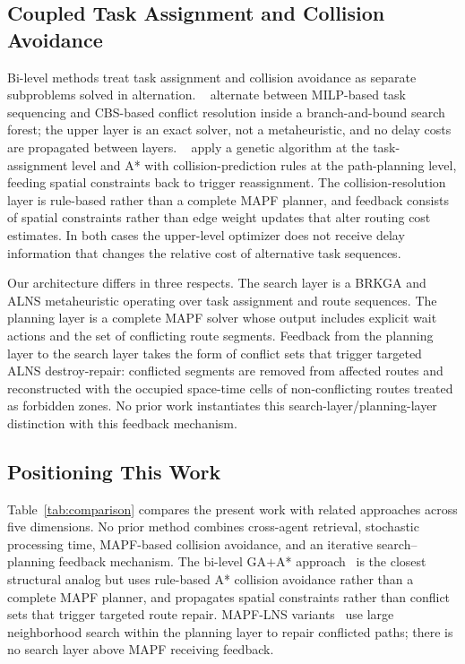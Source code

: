 \documentclass{article}
\begin{document}
\subsection{Coupled Task Assignment and Collision Avoidance}

Bi-level methods treat task assignment and collision avoidance as separate
subproblems solved in alternation.
\citeauthor{cbsts_2025}~\cite{cbsts_2025} alternate between MILP-based task
sequencing and CBS-based conflict resolution inside a branch-and-bound search
forest; the upper layer is an exact solver, not a metaheuristic, and no delay
costs are propagated between layers.
\citeauthor{bilevel_ga_astar_2025}~\cite{bilevel_ga_astar_2025} apply a
genetic algorithm at the task-assignment level and A* with collision-prediction
rules at the path-planning level, feeding spatial constraints back to trigger
reassignment. The collision-resolution layer is rule-based rather than a
complete MAPF planner, and feedback consists of spatial constraints rather than
edge weight updates that alter routing cost estimates. In both cases the
upper-level optimizer does not receive delay information that changes the
relative cost of alternative task sequences.

Our architecture differs in three respects. The search layer is a BRKGA and
ALNS metaheuristic operating over task assignment and route sequences. The
planning layer is a complete MAPF solver whose output includes explicit wait
actions and the set of conflicting route segments. Feedback from the planning
layer to the search layer takes the form of conflict sets that trigger targeted
ALNS destroy-repair: conflicted segments are removed from affected routes and
reconstructed with the occupied space-time cells of non-conflicting routes
treated as forbidden zones. No prior work instantiates this
search-layer/planning-layer distinction with this feedback mechanism.

\subsection{Positioning This Work}

Table~\ref{tab:comparison} compares the present work with related approaches
across five dimensions. No prior method combines cross-agent retrieval,
stochastic processing time, MAPF-based collision avoidance, and an iterative
search--planning feedback mechanism.
The bi-level GA$+$A* approach~\cite{bilevel_ga_astar_2025} is the closest
structural analog but uses rule-based A* collision avoidance rather than a
complete MAPF planner, and propagates spatial constraints rather than conflict
sets that trigger targeted route repair.
MAPF-LNS variants~\cite{mapf_lns_2021, mapf_lns2_2022, balance_2024} use
large neighborhood search within the planning layer to repair conflicted paths;
there is no search layer above MAPF receiving feedback.
\end{document}

